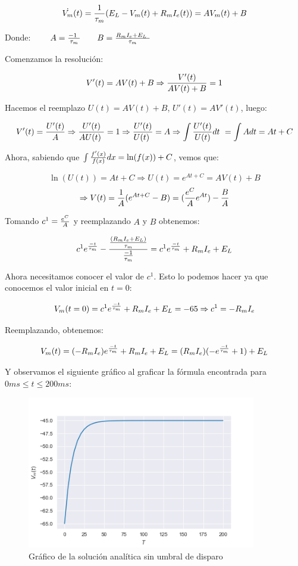 \documentclass [a4paper,12pt,oneside,final]{article}
\begin{document}
\[ \dot{V_m}(t) = {1 \over \tau_m} (E_L - V_m(t) + R_m I_e(t)) = A V_m(t) + B \]

Donde: $ \qquad A = { {- 1} \over \tau_m } \qquad B = { {R_m I_e + E_L} \over \tau_m } $


Comenzamos la resolución:

\[ V'(t) = A V(t) + B  \Rightarrow { V'(t) \over {A V(t) + B} } = 1 \]

Hacemos el reemplazo $ U(t) = A V(t) + B $, $ U'(t) = A V'(t) $, luego:

\[ V'(t) = { U'(t) \over A } \Rightarrow { U'(t) \over A U(t) } = 1 \Rightarrow { U'(t) \over U(t) } = A \Rightarrow { \int {U'(t) \over U(t)} dt } = \int { A dt } = A t + C \]

Ahora, sabiendo que $ \int { {f'(x) \over f(x)} dx } = \ln (f(x)) + C  $, vemos que:

\[ \ln (U(t)) = A t + C  \Rightarrow U(t) = e^{A t + C} = A V(t) + B \]
\[ \Rightarrow V(t) = {1 \over A} ( e^{At + C} - B ) = ({ e^C \over A }e^{At}) - { B \over A } \]

Tomando $ c^1 = { e^C \over A } $ y reemplazando $ A $ y $ B $ obtenemos:

\[ c^1 e^{-t \over \tau_m } - { {( R_m I_e + E_L ) \over \tau_m } \over {-1 \over \tau_m } } = c^1 e^{-t \over \tau_m } + R_m I_e + E_L \]

Ahora necesitamos conocer el valor de $ c^1 $. Esto lo podemos hacer ya que conocemos el valor inicial en $ t = 0 $:

\[ V_m(t = 0) = c^1 e^{ -t \over \tau_m } + R_m I_e + E_L = -65 \Rightarrow c^1 = - R_m I_e \]

Reemplazando, obtenemos:

\[ V_m(t) = (- R_m I_e) e^{-t \over \tau_m} + R_m I_e + E_L = (R_m I_e) (- e^{-t \over \tau_m} + 1) + E_L \]

Y observamos el siguiente gráfico al graficar la fórmula encontrada para $ 0ms \leq t \leq 200ms $:

\begin{figure}[ht]
  \centering
  \includegraphics[width=10cm,keepaspectratio]{./diagramas/grafico_a.png}
  \caption{Gráfico de la solución analítica sin umbral de disparo}
\end{figure}
\end{document}
